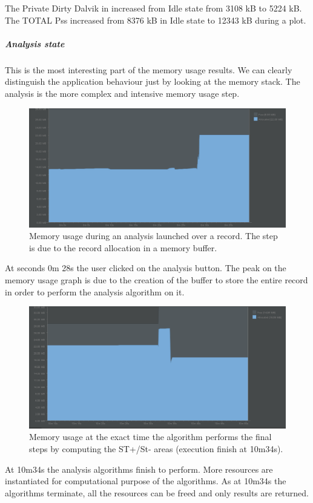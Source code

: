 The Private Dirty Dalvik in increased from Idle state from 3108 kB to  5224 kB. The TOTAL Pss increased from 8376 kB in Idle state to 12343 kB during  a plot.
\newpage
\subparagraph{Analysis state}
This is the most interesting part of the memory usage results. We can clearly distinguish the application behaviour just by looking at the memory stack. The analysis is the more complex and intensive memory usage step.
\begin{figure}[h]
	\centering	
	\includegraphics[width=1\linewidth]{figures/ch10/17.png}
	\caption{Memory usage during an analysis launched over a record. The step is due to the record allocation in a memory buffer.}  
	\label{fig10.17}
\end{figure}
\newline At seconds 0m 28s  the user clicked on the analysis button. The peak on the memory usage graph is due to the creation of the buffer to store the entire record in order to perform the analysis algorithm on it. 
\begin{figure}[h!]
	\centering	
	\includegraphics[width=1\linewidth]{figures/ch10/18.png}
	\caption{ Memory usage at the exact time the algorithm performs the final steps by computing the ST+/St- areas (execution finish at 10m34s).}  
	\label{fig10.18}
\end{figure}
At 10m34s the analysis algorithms finish to perform. More resources are instantiated for computational purpose of the algorithms. As at 10m34s the algorithms terminate, all the resources can be freed and only results are returned.\\
